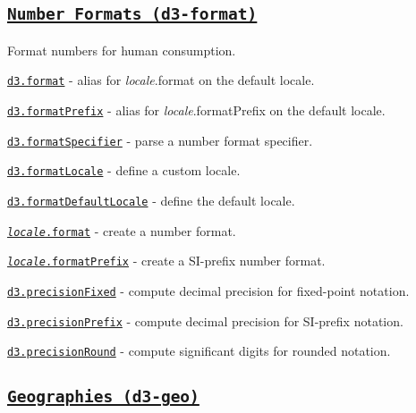 \subsection*{\href{https://github.com/d3/d3-format}{\tt Number Formats (d3-\/format)}}

Format numbers for human consumption.


\begin{DoxyItemize}
\item \href{https://github.com/d3/d3-format/blob/master/README.md#format}{\tt d3.\+format} -\/ alias for {\itshape locale}.format on the default locale.
\item \href{https://github.com/d3/d3-format/blob/master/README.md#formatPrefix}{\tt d3.\+format\+Prefix} -\/ alias for {\itshape locale}.format\+Prefix on the default locale.
\item \href{https://github.com/d3/d3-format/blob/master/README.md#formatSpecifier}{\tt d3.\+format\+Specifier} -\/ parse a number format specifier.
\item \href{https://github.com/d3/d3-format/blob/master/README.md#formatLocale}{\tt d3.\+format\+Locale} -\/ define a custom locale.
\item \href{https://github.com/d3/d3-format/blob/master/README.md#formatDefaultLocale}{\tt d3.\+format\+Default\+Locale} -\/ define the default locale.
\item \href{https://github.com/d3/d3-format/blob/master/README.md#locale_format}{\tt {\itshape locale}.format} -\/ create a number format.
\item \href{https://github.com/d3/d3-format/blob/master/README.md#locale_formatPrefix}{\tt {\itshape locale}.format\+Prefix} -\/ create a S\+I-\/prefix number format.
\item \href{https://github.com/d3/d3-format/blob/master/README.md#precisionFixed}{\tt d3.\+precision\+Fixed} -\/ compute decimal precision for fixed-\/point notation.
\item \href{https://github.com/d3/d3-format/blob/master/README.md#precisionPrefix}{\tt d3.\+precision\+Prefix} -\/ compute decimal precision for S\+I-\/prefix notation.
\item \href{https://github.com/d3/d3-format/blob/master/README.md#precisionRound}{\tt d3.\+precision\+Round} -\/ compute significant digits for rounded notation.
\end{DoxyItemize}

\subsection*{\href{https://github.com/d3/d3-geo}{\tt Geographies (d3-\/geo)}}

